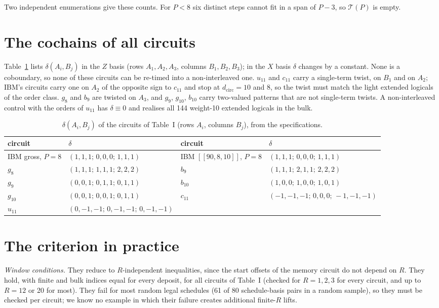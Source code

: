 \documentclass[aps,prl,twocolumn,superscriptaddress,nofootinbib]{revtex4-2}
\newif\ifshowclaimtags \showclaimtagsfalse
\newcommand{\cl}[1]{\ifshowclaimtags\textsuperscript{\textcolor{blue}{\scriptsize[#1]}}\fi}
\newcommand{\dcirc}{d_{\mathrm{circ}}}
\newcommand{\code}[1]{[[#1]]}
\newcommand{\T}{\mathcal{T}}
\begin{document}
Two independent enumerations give these counts. For $P<8$ six distinct steps cannot fit
in a span of $P-3$, so $\T(P)$ is empty.

\section{The cochains of all circuits}\label{sm:delta}\cl{L-10,L-11}
Table~\ref{tab:deltaall} lists $\delta(A_i,B_j)$ in the $Z$ basis (rows $A_1,A_2,A_3$,
columns $B_1,B_2,B_3$); in the $X$ basis $\delta$ changes by a constant. None is a
coboundary, so none of these circuits can be re-timed into a non-interleaved one. $u_{11}$
and $c_{11}$ carry a single-term twist, on $B_1$ and on $A_2$; IBM's circuits carry one on
$A_2$ of the opposite sign to $c_{11}$ and stop at $\dcirc=10$ and 8, so the twist must
match the light extended logicals of the order class. $g_8$ and $b_9$ are twisted on
$A_3$, and $g_9$, $g_{10}$, $b_{10}$ carry two-valued patterns that are not single-term
twists. A non-interleaved control with the orders of $u_{11}$ has $\delta\equiv0$ and
realises all 144 weight-10 extended logicals in the bulk.

\begin{table}[h]
\caption{$\delta(A_i,B_j)$ of the circuits of Table~I (rows $A_i$, columns $B_j$), from the
specifications.}
\label{tab:deltaall}
\begin{ruledtabular}
\begin{tabular}{llll}
circuit & $\delta$ & circuit & $\delta$\\
\hline
IBM gross, $P=8$ & $(1,1,1;\,0,0,0;\,1,1,1)$ & IBM $\code{90,8,10}$, $P=8$ & $(1,1,1;\,0,0,0;\,1,1,1)$\\
$g_8$ & $(1,1,1;\,1,1,1;\,2,2,2)$ & $b_9$ & $(1,1,1;\,2,1,1;\,2,2,2)$\\
$g_9$ & $(0,0,1;\,0,1,1;\,0,1,1)$ & $b_{10}$ & $(1,0,0;\,1,0,0;\,1,0,1)$\\
$g_{10}$ & $(0,0,1;\,0,0,1;\,0,1,1)$ & $c_{11}$ & $(-1,-1,-1;\,0,0,0;\,-1,-1,-1)$\\
$u_{11}$ & $(0,-1,-1;\,0,-1,-1;\,0,-1,-1)$ & & \\
\end{tabular}
\end{ruledtabular}
\end{table}

\section{The criterion in practice}\label{sm:criterion}\cl{L-13,L-14}
\emph{Window conditions.} They reduce to $R$-independent inequalities, since the start
offsets of the memory circuit do not depend on $R$. They hold, with finite and bulk indices
equal for every deposit, for all circuits of Table~I (checked for $R=1,2,3$ for every
circuit, and up to $R=12$ or 20 for most). They fail for most random legal
schedules (61 of 80 schedule-basis pairs in a random sample), so they must be checked per
circuit; we know no example in which their failure creates additional finite-$R$ lifts.
\end{document}
